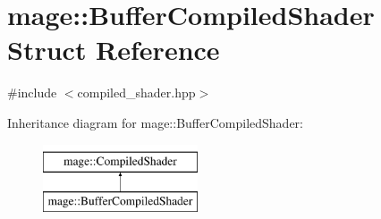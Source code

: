 \hypertarget{structmage_1_1_buffer_compiled_shader}{}\section{mage\+:\+:Buffer\+Compiled\+Shader Struct Reference}
\label{structmage_1_1_buffer_compiled_shader}


{\ttfamily \#include $<$compiled\+\_\+shader.\+hpp$>$}

Inheritance diagram for mage\+:\+:Buffer\+Compiled\+Shader\+:\begin{figure}[H]
\begin{center}
\leavevmode
\includegraphics[height=2.000000cm]{structmage_1_1_buffer_compiled_shader}
\end{center}
\end{figure}
